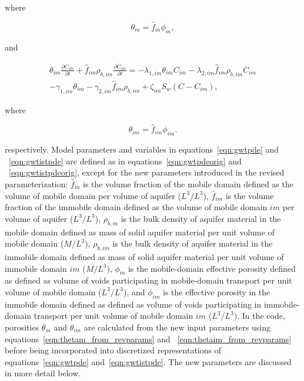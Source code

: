 \noindent where

\begin{equation}
\label{eqn:thetam_from_revparams}
\theta_{m} = \hat{f}_{m} \phi_{m} ,
\end{equation}

\noindent and

\begin{equation}
\label{eqn:gwtistpde}
\begin{split}
\theta_{im} \frac{\partial C_{im} }{\partial t} + \hat{f}_{im} \rho_{b,im} \frac{\partial \overline{C}_{im}}{\partial t} = 
- \lambda_{1,im} \theta_{im} C_{im} - \lambda_{2,im}  \hat{f}_{im} \rho_{b,im} \overline{C}_{im} \\
- \gamma_{1,im} \theta_{im} - \gamma_{2,im} \hat{f}_{im} \rho_{b,im} 
+ \zeta_{im} S_w \left ( C - C_{im} \right ),
\end{split}
\end{equation}

\noindent where

\begin{equation}
\label{eqn:thetaim_from_revparams}
\theta_{im} = \hat{f}_{im} \phi_{im} .
\end{equation}

\noindent respectively. Model parameters and variables in equations~\ref{eqn:gwtpde} and ~\ref{eqn:gwtistpde} are defined as in equations~\ref{eqn:gwtpdeorig} and ~\ref{eqn:gwtistpdeorig}, except for the new parameters introduced in the revised parameterization: $\hat{f}_m$ is the volume fraction of the mobile domain defined as the volume of mobile domain per volume of aquifer ($L^3/L^3$), $\hat{f}_{im}$ is the volume fraction of the immobile domain defined as the volume of mobile domain $im$ per volume of aquifer ($L^3/L^3$), $\rho_{b,m}$ is the bulk density of aquifer material in the mobile domain defined as mass of solid aquifer material per unit volume of mobile domain ($M/L^3$), $\rho_{b,im}$ is the bulk density of aquifer material in the immobile domain defined as mass of solid aquifer material per unit volume of immobile domain $im$ ($M/L^3$), $\phi_m$ is the mobile-domain effective porosity defined as defined as volume of voids participating in mobile-domain transport per unit volume of mobile domain ($L^3/L^3$), and $\phi_{im}$ is the effective porosity in the immobile domain defined as defined as volume of voids participating in immobile-domain transport per unit volume of mobile domain $im$ ($L^3/L^3$). In the \mf code, porosities $\theta_{m}$ and $\theta_{im}$ are calculated from the new input parameters using equations~\ref{eqn:thetam_from_revparams} and ~\ref{eqn:thetaim_from_revparams} before being incorporated into discretized representations of equations~\ref{eqn:gwtpde} and~\ref{eqn:gwtistpde}. The new parameters are discussed in more detail below.

